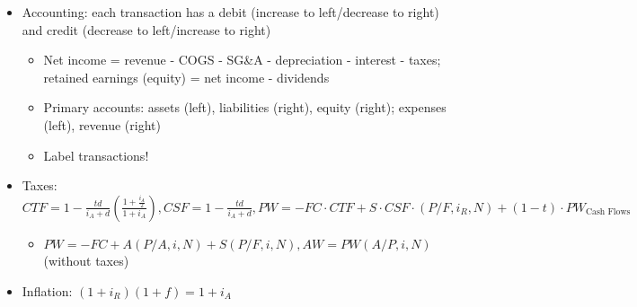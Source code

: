 \documentclass[
]{article}
\providecommand{\tightlist}{%
  \setlength{\itemsep}{0pt}\setlength{\parskip}{0pt}}
\begin{document}
\begin{itemize}
  \begin{itemize}
  \tightlist
  \item
    Straight line: \(D_t = \frac{B - S}{N}\)
  \item
    Declining balance:
    \(D_t = BV_{t - 1}d, d = 1 - \left(\frac{S}{B}\right)^\frac{1}{N}\)
    or \(d = \frac{200\%}{N}\) (double declining balance)
  \item
    Sum of the years' digits:
    \(D_t = \frac{N - t + 1}{SOYD}(B - S), SOYD = \frac{N(N + 1)}{2}\)
  \item
    Units of production:
    \(D_t = \frac{\text{Production in year }t}{\text{Total production}}(B - S)\)
  \end{itemize}
\item
  Accounting: each transaction has a debit (increase to left/decrease to
  right) and credit (decrease to left/increase to right)

  \begin{itemize}
  \tightlist
  \item
    Net income = revenue - COGS - SG\&A - depreciation - interest -
    taxes; retained earnings (equity) = net income - dividends
  \item
    Primary accounts: assets (left), liabilities (right), equity
    (right); expenses (left), revenue (right)
  \item
    Label transactions!
  \end{itemize}
\item
  Taxes:
  \(CTF = 1 - \frac{td}{i_A + d}\left(\frac{1 + \frac{i_A}{2}}{1 + i_A}\right), CSF = 1 - \frac{td}{i_A + d}, PW = -FC \cdot CTF + S \cdot CSF \cdot (P/F, i_R, N) + (1 - t) \cdot PW_{\text{Cash Flows}}\)

  \begin{itemize}
  \tightlist
  \item
    \(PW = -FC + A(P/A, i, N) + S(P/F, i, N), AW = PW(A/P, i, N)\)
    (without taxes)
  \end{itemize}
\item
  Inflation: \((1 + i_R)(1 + f) = 1 + i_A\)
\end{itemize}
\end{document}
